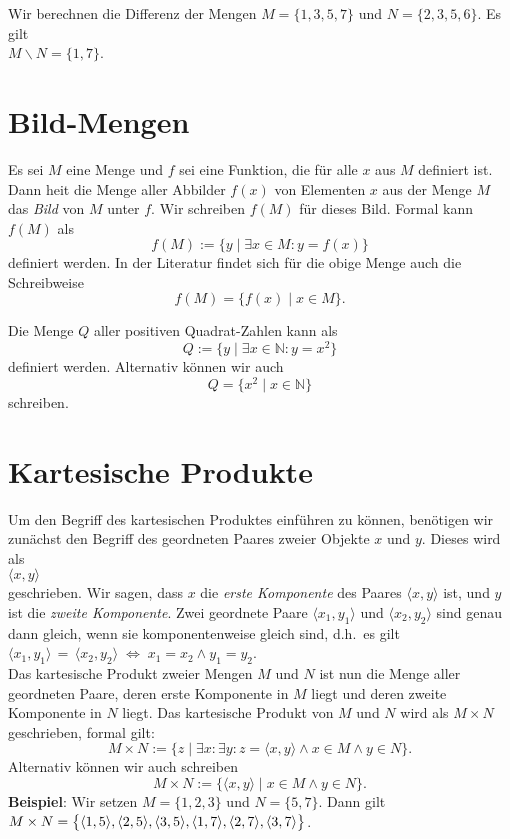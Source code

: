 \example
Wir berechnen die Differenz der Mengen $M = \{ 1, 3, 5, 7 \}$ und $N = \{ 2, 3, 5, 6 \}$.  Es gilt
\\[0.2cm]
\hspace*{1.3cm} $M \backslash N = \{ 1, 7 \}$. \eox

\section{Bild-Mengen}
Es sei $M$ eine Menge und $f$ sei eine Funktion, die f\"{u}r alle $x$ aus $M$ definiert ist.
Dann hei\3t die Menge aller Abbilder $f(x)$ von Elementen $x$ aus der Menge $M$ das
\emph{Bild} von $M$ unter $f$.  Wir schreiben $f(M)$ f\"{u}r dieses Bild.
Formal kann $f(M)$ als
 \[ f(M) := \{ y \;|\; \exists x \in M: y = f(x) \} \]
definiert werden. In der Literatur findet sich f\"{u}r die obige Menge auch die Schreibweise
\[ f(M) = \bigl\{ f(x) \;|\; x \in M \}. \]

\example
Die Menge $Q$ aller positiven Quadrat-Zahlen kann als 
\[ Q := \{ y \mid \exists x \in \mathbb{N}: y = x^2\} \]
definiert werden.  Alternativ k\"{o}nnen wir auch 
\[ Q = \bigl\{ x^2 \mid x \in \mathbb{N} \bigr\} \]
schreiben.
\eox


\section{Kartesische Produkte}
Um den Begriff des kartesischen Produktes einf\"{u}hren zu k\"{o}nnen, ben\"{o}tigen wir zun\"{a}chst den Begriff
des geordneten Paares zweier Objekte $x$ und $y$.  Dieses wird  als \\[0.2cm]
\hspace*{1.3cm} $\langle x, y \rangle$ \\[0.2cm]
geschrieben.  Wir sagen, dass $x$ die \emph{erste Komponente} des Paares $\langle x, y \rangle$ ist, 
und $y$ ist die \emph{zweite Komponente}.  Zwei geordnete Paare $\langle x_1, y_1 \rangle$ und $\langle x_2, y_2 \rangle$
sind genau dann gleich, wenn sie komponentenweise gleich sind, d.h.~es gilt \\[0.2cm]
\hspace*{1.3cm} $\langle x_1, y_1 \rangle \,=\,\langle x_2, y_2 \rangle  \;\Leftrightarrow\; x_1 = x_2 \wedge y_1 = y_2$. \\[0.2cm]
Das kartesische Produkt zweier Mengen $M$ und $N$ ist nun die Menge aller geordneten
Paare, deren erste Komponente in $M$ liegt und deren zweite Komponente in $N$ liegt.
Das kartesische Produkt von $M$ und $N$ wird als $M \times N$ geschrieben, formal gilt: 
\[ M \times N := \big\{ z \mid \exists x\colon \exists y\colon z = \langle x,y\rangle \wedge x\in M \wedge y \in N \}. \]
Alternativ k\"{o}nnen wir auch schreiben
\[ M \times N := \big\{ \langle x,y\rangle \mid  x\in M \wedge y \in N \}. \]
\noindent
\textbf{Beispiel}:  Wir setzen $M = \{ 1, 2, 3 \}$ und $N = \{ 5, 7 \}$. Dann gilt\\[0.2cm]
\hspace*{1.3cm} 
$M \times N = \bigl\{ \pair(1,5),\pair(2,5),\pair(3,5),\pair(1,7),\pair(2,7),\pair(3,7)\bigr\}$.
\vspace{0.2cm}

